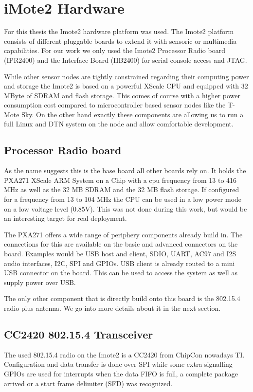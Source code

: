 \chapter{iMote2 Hardware}
For this thesis the Imote2 hardware platform was used. The Imote2 platform
consists of different pluggable boards to extend it with sensoric or multimedia
capabilities. For our work we only used the Imote2 Processor Radio board
(IPR2400) and the Interface Board (IIB2400) for serial console access and JTAG.

While other sensor nodes are tightly constrained regarding their computing power
and storage the Imote2 is based on a powerful XScale CPU and equipped with 32
MByte of SDRAM and flash storage. This comes of course with a higher power
consumption cost compared to microcontroller based sensor nodes like the T-Mote
Sky. On the other hand exactly these components are allowing us to run a full
Linux and DTN system on the node and allow comfortable development.

\section{Processor Radio board}
As the name suggests this is the base board all other boards rely on. It holds
the PXA271 XScale ARM System on a Chip with a cpu frequency from 13 to 416 MHz
as well as the 32 MB SDRAM and the 32 MB flash storage. If configured for a
frequency from 13 to 104 MHz the CPU can be used in a low power mode on a low
voltage level (0.85V). This was not done during this work, but would be an
interesting target for real deployment.

The PXA271 offers a wide range of periphery components already build in. The
connections for this are available on the basic and advanced connectors on the
board. Examples would be USB host and client, SDIO, UART, AC97 and I2S audio
interfaces, I2C, SPI and GPIOs. USB client is already routed to a mini USB
connector on the board. This can be used to access the system as well as supply
power over USB.

The only other component that is directly build onto this board is the 802.15.4
radio plus antenna. We go into more details about it in the next section.

\section{CC2420 802.15.4 Transceiver}
The used 802.15.4 radio on the Imote2 is a CC2420 from ChipCon nowadays TI.
Configuration and data transfer is done over SPI while some extra signalling
GPIOs are used for interrupts when the data FIFO is full, a complete package
arrived or a start frame delimiter (SFD) was recognized.


